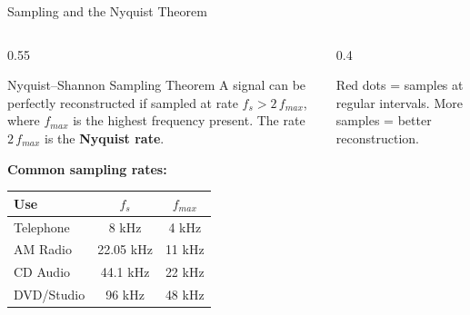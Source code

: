 \documentclass[aspectratio=169,12pt]{beamer}
\begin{document}
\begin{frame}{Sampling and the Nyquist Theorem}
    \begin{columns}
        \begin{column}{0.55\textwidth}
            \begin{block}{Nyquist--Shannon Sampling Theorem}
                A signal can be perfectly reconstructed if sampled at rate $f_s > 2\,f_{max}$, where $f_{max}$ is the highest frequency present. The rate $2\,f_{max}$ is the \textbf{Nyquist rate}.
            \end{block}
            
            \vspace{0.1cm}
            \textbf{Common sampling rates:}
            \begin{center}
                \small
                \begin{tabular}{l|c|c}
                    \toprule
                    Use & $f_s$ & $f_{max}$ \\
                    \midrule
                    Telephone & 8 kHz & 4 kHz \\
                    AM Radio & 22.05 kHz & 11 kHz \\
                    CD Audio & 44.1 kHz & 22 kHz \\
                    DVD/Studio & 96 kHz & 48 kHz \\
                    \bottomrule
                \end{tabular}
            \end{center}
        \end{column}
        \begin{column}{0.4\textwidth}
            \begin{center}
            \end{center}
            {\small Red dots = samples at regular intervals. More samples = better reconstruction.}
        \end{column}
    \end{columns}
\end{frame}
\end{document}

